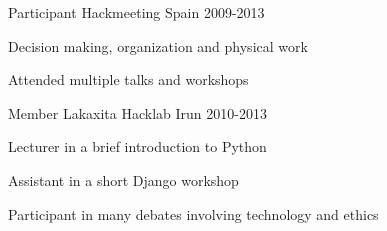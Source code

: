 

\begin{cventries}

  \cventry
    {Participant} %
    {Hackmeeting} %
    {Spain} %
    {2009-2013} %
    {
      \begin{cvitems} %
        \item {Decision making, organization and physical work}
        \item {Attended multiple talks and workshops}
      \end{cvitems}
    }

  \cventry
    {Member} %
    {Lakaxita Hacklab} %
    {Irun} %
    {2010-2013} %
    {
      \begin{cvitems} %
        \item {Lecturer in a brief introduction to Python}
        \item {Assistant in a short Django workshop}
        \item {Participant in many debates involving technology and ethics}
      \end{cvitems}
    }

\end{cventries}
